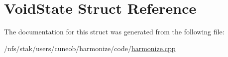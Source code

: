 \hypertarget{structVoidState}{\section{Void\-State Struct Reference}
\label{structVoidState}
}


The documentation for this struct was generated from the following file\-:\begin{DoxyCompactItemize}
\item 
/nfs/stak/users/cuneob/harmonize/code/\hyperlink{harmonize_8cpp}{harmonize.\-cpp}\end{DoxyCompactItemize}
